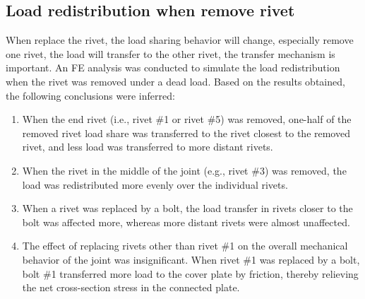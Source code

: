 \subsection{Load redistribution when remove rivet}
 
When replace the rivet, the load sharing behavior will change, especially remove one rivet, the load will transfer to the other rivet, the transfer mechanism is important. An FE analysis was conducted to simulate the load redistribution when the rivet was removed under a dead load. Based on the results obtained, the following conclusions were inferred:

\begin{enumerate}
    \item When the end rivet (i.e., rivet \#1 or rivet \#5) was removed, one-half of the removed rivet load share was transferred to the rivet closest to the removed rivet, and less load was transferred to more distant rivets.

    \item When the rivet in the middle of the joint (e.g., rivet \#3) was removed, the load was redistributed more evenly over the individual rivets.

    \item When a rivet was replaced by a bolt, the load transfer in rivets closer to the bolt was affected more, whereas more distant rivets were almost unaffected.

    \item The effect of replacing rivets other than rivet \#1 on the overall mechanical behavior of the joint was insignificant. When rivet \#1 was replaced by a bolt, bolt \#1 transferred more load to the cover plate by friction, thereby relieving the net cross-section stress in the connected plate.
    
\end{enumerate}




